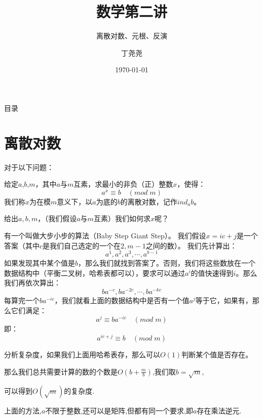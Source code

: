 \documentclass{beamer}
\title{数学第二讲}
\subtitle{离散对数、元根、反演}
\author{丁尧尧}
\institute{上海交通大学}
\date{\today}
\begin{document}
	\maketitle
	\begin{frame}{目录}
		\tableofcontents
	\end{frame}
	
	\section{离散对数}
		\begin{frame}
			对于以下问题：
			\begin{definition}[离散对数]
				给定$a$,$b$,$m$，其中$a$与$m$互素，求最小的非负（正）整数$x$，使得：
				$$
				a^x \equiv b \quad (mod \; m)
				$$
				我们称$x$为在模$m$意义下，以$a$为底的$b$的离散对数，记作$ind_ab$。
			\end{definition}
			给出$a,b,m$，（我们假设$a$与$m$互素）我们如何求$x$呢？
		\end{frame}
		\begin{frame}
			有一个叫做大步小步的算法（Baby Step Giant Step）。
			我们假设$x = ic + j$是一个答案（其中$c$是我们自己选定的一个在$2,m-1$之间的数）。
			我们先计算出：
			$$
			a^1, a^2, a^3, \cdots, a^{b-1}
			$$			
			如果发现其中某个值是$b$，那么我们就找到答案了。否则，我们将这些数放在一个数据结构中（平衡二叉树，哈希表都可以），要求可以通过$a^i$的值快速得到$i$。那么我们再依次算出：
			$$
			ba^{-c}, ba^{-2c}, \cdots, ba^{-kc}
			$$
			每算完一个$ba^{-ic}$，我们就看上面的数据结构中是否有一个值$a^j$等于它，如果有，那么它们满足：
			$$
			a^j \equiv ba^{-ic} \quad (mod \; m)
			$$
			即：
			$$
			a^{ic + j} \equiv b \quad (mod \; m)
			$$
		\end{frame}
		\begin{frame}
			分析复杂度，如果我们上面用哈希表存，那么可以$O(1)$判断某个值是否存在。
			
			那么我们总共需要计算的数的个数是$O(b + \frac{m}{b})$,我们取$b = \sqrt{m}$,
			
			可以得到$O(\sqrt{m})$的复杂度.
			
			上面的方法,$a$不限于整数,还可以是矩阵,但都有同一个要求,即$a$存在乘法逆元.
		\end{frame}
\end{document}
